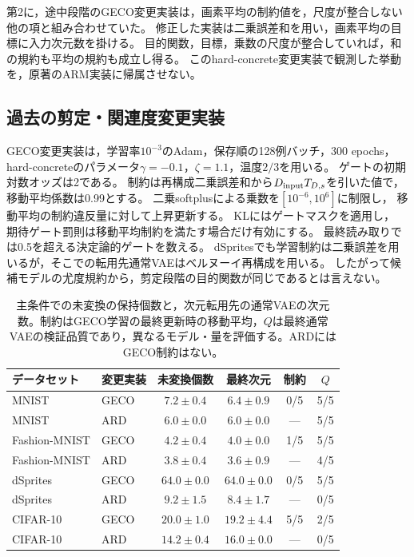 \documentclass[11pt,a4paper]{ltjsarticle}
\begin{document}
第2に，途中段階のGECO変更実装は，画素平均の制約値を，尺度が整合しない他の項と組み合わせていた。
修正した実装は二乗誤差和を用い，画素平均の目標に入力次元数を掛ける。
目的関数，目標，乗数の尺度が整合していれば，和の規約も平均の規約も成立し得る。
このhard-concrete変更実装で観測した挙動を，原著のARM実装に帰属させない。

\subsection{過去の剪定・関連度変更実装}\label{app:adaptations}
GECO変更実装は，学習率$10^{-3}$のAdam，保存順の128例バッチ，300 epochs，
hard-concreteのパラメータ$\gamma=-0.1$，$\zeta=1.1$，温度$2/3$を用いる。
ゲートの初期対数オッズは2である。
制約は再構成二乗誤差和から$D_{\rm input}T_{D,s}$を引いた値で，
移動平均係数は0.99とする。
二乗softplusによる乗数を$[10^{-6},10^6]$に制限し，
移動平均の制約違反量に対して上昇更新する。
KLにはゲートマスクを適用し，
期待ゲート罰則は移動平均制約を満たす場合だけ有効にする。
最終読み取りでは0.5を超える決定論的ゲートを数える。
dSpritesでも学習制約は二乗誤差を用いるが，そこでの転用先通常VAEはベルヌーイ再構成を用いる。
したがって候補モデルの尤度規約から，剪定段階の目的関数が同じであるとは言えない。

\begin{table}[H]
\caption{主条件での未変換の保持個数と，次元転用先の通常VAEの次元数。制約はGECO学習の最終更新時の移動平均，$Q$は最終通常VAEの検証品質であり，異なるモデル・量を評価する。ARDにはGECO制約はない。}\label{tab:pruning}
\footnotesize
\setlength{\tabcolsep}{3.5pt}
\begin{tabular*}{\textwidth}{@{\extracolsep{\fill}}llcccc@{}}
\toprule
データセット & 変更実装 & 未変換個数 & 最終次元 & 制約 & $Q$ \\
\midrule
MNIST & GECO & $7.2 \pm 0.4$ & $6.4 \pm 0.9$ & 0/5 & 5/5 \\
MNIST & ARD & $6.0 \pm 0.0$ & $6.0 \pm 0.0$ & --- & 5/5 \\
Fashion-MNIST & GECO & $4.2 \pm 0.4$ & $4.0 \pm 0.0$ & 1/5 & 5/5 \\
Fashion-MNIST & ARD & $3.8 \pm 0.4$ & $3.6 \pm 0.9$ & --- & 4/5 \\
dSprites & GECO & $64.0 \pm 0.0$ & $64.0 \pm 0.0$ & 0/5 & 5/5 \\
dSprites & ARD & $9.2 \pm 1.5$ & $8.4 \pm 1.7$ & --- & 0/5 \\
CIFAR-10 & GECO & $20.0 \pm 1.0$ & $19.2 \pm 4.4$ & 5/5 & 2/5 \\
CIFAR-10 & ARD & $14.2 \pm 0.4$ & $16.0 \pm 0.0$ & --- & 0/5 \\
\bottomrule
\end{tabular*}
\end{table}
\end{document}
